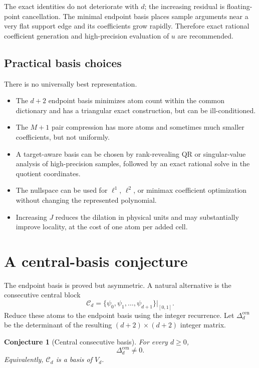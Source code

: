 \documentclass[11pt,oneside]{article}
\newtheorem{conjecture}[theorem]{Conjecture}
\theoremstyle{definition}
\theoremstyle{remark}
\begin{document}
The exact identities do not deteriorate with $d$; the increasing residual is floating-point cancellation.  The minimal endpoint basis places sample arguments near a very flat support edge and its coefficients grow rapidly.  Therefore exact rational coefficient generation and high-precision evaluation of $u$ are recommended.

\subsection{Practical basis choices}
There is no universally best representation.
\begin{itemize}
\item The $d+2$ endpoint basis minimizes atom count within the common dictionary and has a triangular exact construction, but can be ill-conditioned.
\item The $M+1$ pair compression has more atoms and sometimes much smaller coefficients, but not uniformly.
\item A target-aware basis can be chosen by rank-revealing QR or singular-value analysis of high-precision samples, followed by an exact rational solve in the quotient coordinates.
\item The nullspace can be used for $\ell^1$, $\ell^2$, or minimax coefficient optimization without changing the represented polynomial.
\item Increasing $J$ reduces the dilation in physical units and may substantially improve locality, at the cost of one atom per added cell.
\end{itemize}

\section{A central-basis conjecture}
\label{sec:central-conjecture}

The endpoint basis is proved but asymmetric.  A natural alternative is the consecutive central block
\begin{equation}
 \mathcal C_d=\{\psi_0,\psi_1,\ldots,\psi_{d+1}\}|_{[0,1]}. \label{eq:central-block}
\end{equation}
Reduce these atoms to the endpoint basis using the integer recurrence.  Let $\Delta_d^{\mathrm{cen}}$ be the determinant of the resulting $(d+2)\times(d+2)$ integer matrix.

\begin{conjecture}[Central consecutive basis]
\label{conj:central-basis}
For every $d\ge0$,
\begin{equation}
 \Delta_d^{\mathrm{cen}}\ne0.                              \label{eq:central-nonzero}
\end{equation}
Equivalently, $\mathcal C_d$ is a basis of $V_d$.
\end{conjecture}
\end{document}
